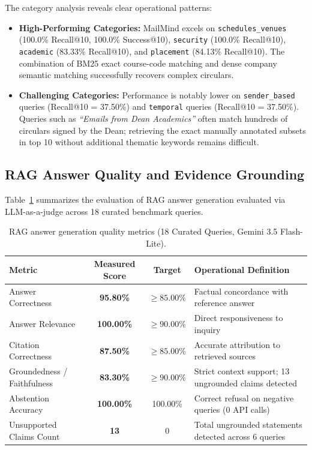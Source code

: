 \documentclass[11pt,a4paper]{article}
\begin{document}
The category analysis reveals clear operational patterns:
\begin{itemize}
    \item \textbf{High-Performing Categories:} MailMind excels on \texttt{schedules\_venues} (100.0\% Recall@10, 100.0\% Success@10), \texttt{security} (100.0\% Recall@10), \texttt{academic} (83.33\% Recall@10), and \texttt{placement} (84.13\% Recall@10). The combination of BM25 exact course-code matching and dense company semantic matching successfully recovers complex circulars.
    \item \textbf{Challenging Categories:} Performance is notably lower on \texttt{sender\_based} queries (Recall@10 = 37.50\%) and \texttt{temporal} queries (Recall@10 = 37.50\%). Queries such as \textit{``Emails from Dean Academics''} often match hundreds of circulars signed by the Dean; retrieving the exact manually annotated subsets in top 10 without additional thematic keywords remains difficult.
\end{itemize}

\subsection{RAG Answer Quality and Evidence Grounding}
Table~\ref{tab:rag_quality} summarizes the evaluation of RAG answer generation evaluated via LLM-as-a-judge across 18 curated benchmark queries.

\begin{table}[t]
\centering
\small
\caption{RAG answer generation quality metrics (18 Curated Queries, Gemini 3.5 Flash-Lite).}
\label{tab:rag_quality}
\begin{tabular}{l c c l}
\toprule
\textbf{Metric} & \textbf{Measured Score} & \textbf{Target} & \textbf{Operational Definition} \\
\midrule
Answer Correctness & \textbf{95.80\%} & $\ge 85.00\%$ & Factual concordance with reference answer \\
Answer Relevance & \textbf{100.00\%} & $\ge 90.00\%$ & Direct responsiveness to inquiry \\
Citation Correctness & \textbf{87.50\%} & $\ge 85.00\%$ & Accurate attribution to retrieved sources \\
Groundedness / Faithfulness & \textbf{83.30\%} & $\ge 90.00\%$ & Strict context support; 13 ungrounded claims detected \\
Abstention Accuracy & \textbf{100.00\%} & 100.00\% & Correct refusal on negative queries (0 API calls) \\
Unsupported Claims Count & \textbf{13} & 0 & Total ungrounded statements detected across 6 queries \\
\bottomrule
\end{tabular}
\end{table}
\end{document}
